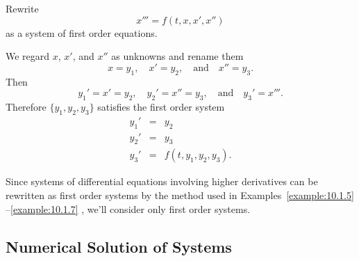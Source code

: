 \documentclass{ximera}
\begin{document}
\begin{example}\label{example:10.1.7}
 Rewrite
$$
x'''=f(t,x,x',x'')
$$
as a system of first order equations.

\begin{explanation}
We regard $x$, $x'$, and $x''$ as unknowns and rename them
$$
x=y_1, \quad x'=y_2,\quad\mbox{and}\quad x''=y_3.
$$
Then
$$
y_1'=x'=y_2,\quad y_2'=x''=y_3,\quad\mbox{and}\quad y_3'=x'''.
$$
Therefore $\{y_1,y_2,y_3\}$ satisfies the first order system
$$
\begin{array}{ccl}
y_1'&=&y_2\\
y_2'&=&y_3\\
y_3'&=&f(t,y_1,y_2,y_3).
\end{array}
$$
\end{explanation}
\end{example}

Since systems of differential equations involving higher derivatives
can be rewritten as first order systems by the method used in
Examples~\ref{example:10.1.5} --\ref{example:10.1.7} , we'll consider only first
order systems.

\subsection*{Numerical Solution of Systems}
\end{document}

